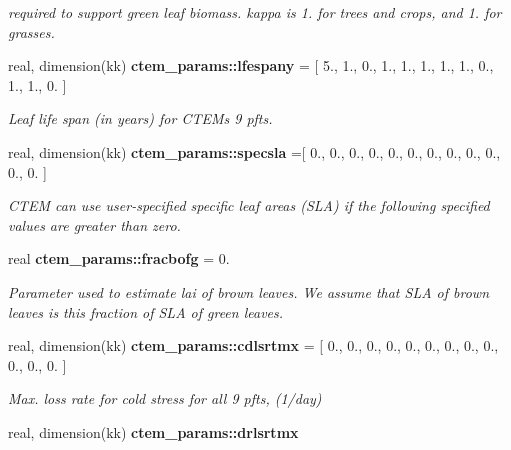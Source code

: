 \begin{DoxyCompactItemize}
\begin{DoxyCompactList}\small\item\em required to support green leaf biomass. kappa is 1. for trees and crops, and 1. for grasses. \end{DoxyCompactList}\item 
\hypertarget{namespacectem__params_aa093866c5338fea3488dc5cfdb9449af}{}real, dimension(kk) {\bfseries ctem\+\_\+params\+::lfespany} = \mbox{[} 5., 1., 0., 1., 1., 1., 1., 1., 0., 1., 1., 0. \mbox{]}\label{namespacectem__params_aa093866c5338fea3488dc5cfdb9449af}

\begin{DoxyCompactList}\small\item\em Leaf life span (in years) for C\+T\+E\+M\textquotesingle{}s 9 pfts. \end{DoxyCompactList}\item 
\hypertarget{namespacectem__params_adc0f8a65d365deb6112b767066c25929}{}real, dimension(kk) {\bfseries ctem\+\_\+params\+::specsla} =\mbox{[} 0., 0., 0., 0., 0., 0., 0., 0., 0., 0., 0., 0. \mbox{]}\label{namespacectem__params_adc0f8a65d365deb6112b767066c25929}

\begin{DoxyCompactList}\small\item\em C\+T\+E\+M can use user-\/specified specific leaf areas (S\+L\+A) if the following specified values are greater than zero. \end{DoxyCompactList}\item 
\hypertarget{namespacectem__params_a220bfc3b9a9be5d41edb3eda82a2988e}{}real {\bfseries ctem\+\_\+params\+::fracbofg} = 0.\label{namespacectem__params_a220bfc3b9a9be5d41edb3eda82a2988e}

\begin{DoxyCompactList}\small\item\em Parameter used to estimate lai of brown leaves. We assume that S\+L\+A of brown leaves is this fraction of S\+L\+A of green leaves. \end{DoxyCompactList}\item 
\hypertarget{namespacectem__params_a22b7dcf204415799531485f3e75e91a9}{}real, dimension(kk) {\bfseries ctem\+\_\+params\+::cdlsrtmx} = \mbox{[} 0., 0., 0., 0., 0., 0., 0., 0., 0., 0., 0., 0. \mbox{]}\label{namespacectem__params_a22b7dcf204415799531485f3e75e91a9}

\begin{DoxyCompactList}\small\item\em Max. loss rate for cold stress for all 9 pfts, (1/day) \end{DoxyCompactList}\item 
\hypertarget{namespacectem__params_adcdbf5080dbbe4117e28dad60b76a0d9}{}real, dimension(kk) {\bfseries ctem\+\_\+params\+::drlsrtmx}\label{namespacectem__params_adcdbf5080dbbe4117e28dad60b76a0d9}


\end{DoxyCompactItemize}
